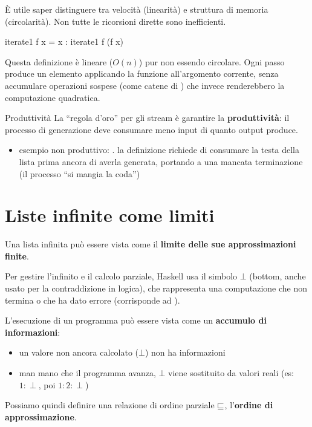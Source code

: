 È utile saper distinguere tra velocità (linearità) e struttura di memoria (circolarità). Non tutte le ricorsioni dirette sono inefficienti.
\begin{haskellbox}{}
iterate1 f x = x : iterate1 f (f x)
\end{haskellbox}

Questa definizione è lineare ($O(n)$) pur non essendo circolare. Ogni passo produce un elemento applicando la funzione all'argomento corrente, senza accumulare operazioni sospese (come catene di ) che invece renderebbero la computazione quadratica.

\begin{gframe}{Produttività}
La ``regola d'oro'' per gli stream è garantire la \textbf{produttività}: il processo di generazione deve consumare meno input di quanto output produce. 
\begin{itemize}
    \item esempio non produttivo: .
    \subitem la definizione richiede di consumare la testa della lista prima ancora di averla generata, portando a una mancata terminazione (il processo ``si mangia la coda'')
\end{itemize}
\end{gframe}

\section{Liste infinite come limiti}
Una lista infinita può essere vista come il \textbf{limite delle sue approssimazioni finite}.

Per gestire l'infinito e il calcolo parziale, Haskell usa il simbolo $\bot$ (bottom, anche usato per la contraddizione in logica), che rappresenta una computazione che non termina o che ha dato errore (corrisponde ad ).

L'esecuzione di un programma può essere vista come un \textbf{accumulo di informazioni}:
\begin{itemize}
    \item un valore non ancora calcolato ($\bot$) non ha informazioni
    \item man mano che il programma avanza, $\bot$ viene sostituito da valori reali (es: $1:\perp$, poi $1:2:\perp$)
\end{itemize}

Possiamo quindi definire una relazione di ordine parziale $\sqsubseteq$, l'\textbf{ordine di approssimazione}.

